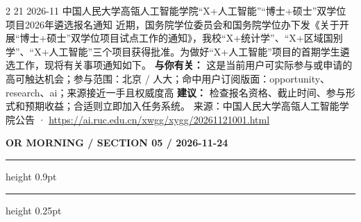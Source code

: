 \documentclass[10.5pt]{ctexart}
\begin{document}
\begin{multicols}{2}
21 2026-11 中国人民大学高瓴人工智能学院“X+人工智能”“博士+硕士”双学位项目2026年遴选报名通知 近期，国务院学位委员会和国务院学位办下发《关于开展“博士+硕士”双学位项目试点工作的通知》，我校“X+统计学”、“X+区域国别学”、“X+人工智能”三个项目获得批准。为做好“X+人工智能”项目的首期学生遴选工作，现将有关事项通知如下。
\textbf{与你有关：} 这是当前用户可实际参与或申请的高可触达机会；参与范围：北京 / 人大；命中用户订阅版面：opportunity、research、ai；来源接近一手且权威度高
\textbf{建议：} 检查报名资格、截止时间、参与形式和预期收益；合适则立即加入任务系统。
{\footnotesize\color{ormuted} 来源：中国人民大学高瓴人工智能学院公告 · \url{https://ai.ruc.edu.cn/xwgg/xygg/20261121001.html}}
\end{multicols}
\newpage
{\small\bfseries OR MORNING / SECTION 05 / 2026-11-24}
\vspace{2mm}
\hrule height 0.9pt
\vspace{1.5mm}
\hrule height 0.25pt
\vspace{4mm}
\end{document}
